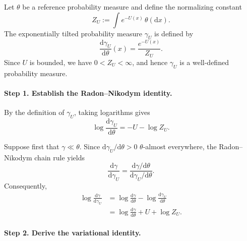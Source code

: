 \documentclass[12pt,a4paper,oneside]{book}
\begin{document}
\begin{solution}
Let $\theta$ be a reference probability measure and define the
normalizing constant
\begin{equation*}
    Z_U:=\int e^{-U(x)}\,\theta(\mathrm dx).
\end{equation*}
The exponentially tilted probability measure $\gamma_U$ is defined by
\begin{equation*}
    \frac{\mathrm d\gamma_U}{\mathrm d\theta}(x)
    =\frac{e^{-U(x)}}{Z_U}.
\end{equation*}
Since $U$ is bounded, we have $0<Z_U<\infty$, and hence
$\gamma_U$ is a well-defined probability measure.

\paragraph{Step 1. Establish the Radon--Nikodym identity.}

By the definition of $\gamma_U$, taking logarithms gives
\begin{equation*}
    \log\frac{\mathrm d\gamma_U}{\mathrm d\theta}
    =-U-\log Z_U.
\end{equation*}

Suppose first that $\gamma\ll\theta$. Since
$\mathrm d\gamma_U/\mathrm d\theta>0$ $\theta$-almost everywhere,
the Radon--Nikodym chain rule yields
\begin{equation*}
    \frac{\mathrm d\gamma}{\mathrm d\gamma_U}
    =
    \frac{\mathrm d\gamma/\mathrm d\theta}
         {\mathrm d\gamma_U/\mathrm d\theta}.
\end{equation*}
Consequently,
\begin{equation*}
    \begin{aligned}
        \log\frac{\mathrm d\gamma}{\mathrm d\gamma_U}
        &=
        \log\frac{\mathrm d\gamma}{\mathrm d\theta}
        -\log\frac{\mathrm d\gamma_U}{\mathrm d\theta}\\
        &=
        \log\frac{\mathrm d\gamma}{\mathrm d\theta}
        +U+\log Z_U.
    \end{aligned}
\end{equation*}

\paragraph{Step 2. Derive the variational identity.}


\end{solution}
\end{document}
